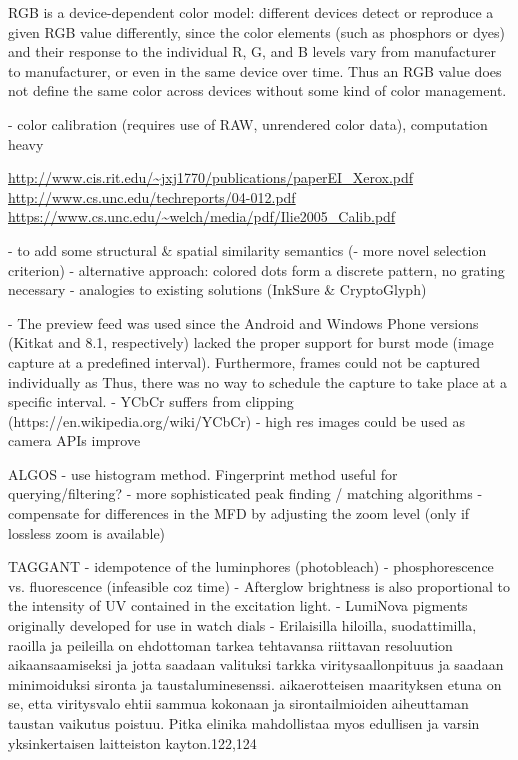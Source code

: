 \documentclass[thesis.tex]{subfiles}
\begin{document}
RGB is a device-dependent color model: different devices detect or reproduce a given RGB value differently, since the color elements (such as phosphors or dyes) and their response to the individual R, G, and B levels vary from manufacturer to manufacturer, or even in the same device over time. Thus an RGB value does not define the same color across devices without some kind of color management.

- color calibration (requires use of RAW, unrendered color data), computation heavy

\url{http://www.cis.rit.edu/~jxj1770/publications/paperEI_Xerox.pdf}
\url{http://www.cs.unc.edu/techreports/04-012.pdf}
\url{https://www.cs.unc.edu/~welch/media/pdf/Ilie2005_Calib.pdf}




- to add some structural \& spatial similarity semantics (- more novel selection criterion)
  - alternative approach: colored dots form a discrete pattern, no grating necessary
  - analogies to existing solutions (InkSure \& CryptoGlyph)

- The preview feed was used since the Android and Windows Phone versions (Kitkat and 8.1, respectively) lacked the proper support for burst mode (image capture at a predefined interval). Furthermore, frames could not be captured individually as Thus, there was no way to schedule the capture to take place at a specific interval.
  - YCbCr suffers from clipping (https://en.wikipedia.org/wiki/YCbCr)
  - high res images could be used as camera APIs improve

ALGOS
- use histogram method. Fingerprint method useful for querying/filtering?
- more sophisticated peak finding / matching algorithms
- compensate for differences in the MFD by adjusting the zoom level (only if lossless zoom is available)

TAGGANT
- idempotence of the luminphores (photobleach)
- phosphorescence vs. fluorescence (infeasible coz time)
- Afterglow brightness is also proportional to the intensity of UV contained in the excitation light.
- LumiNova pigments originally developed for use in watch dials
- Erilaisilla hiloilla, suodattimilla, raoilla ja peileilla on ehdottoman tarkea tehtavansa riittavan resoluution aikaansaamiseksi ja jotta saadaan valituksi tarkka viritysaallonpituus ja saadaan minimoiduksi sironta ja taustaluminesenssi. aikaerotteisen maarityksen etuna on se, etta viritysvalo ehtii sammua kokonaan ja sirontailmioiden aiheuttaman taustan vaikutus poistuu. Pitka elinika mahdollistaa myos edullisen ja varsin yksinkertaisen laitteiston kayton.122,124
\end{document}
